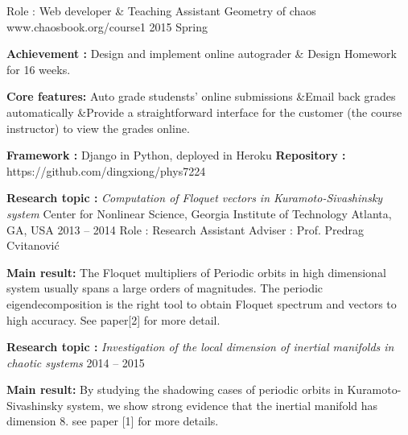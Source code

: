


\begin{cventries}


\cventry
{Role : Web developer \& Teaching Assistant}
{Geometry of chaos}
{www.chaosbook.org/course1}
{2015 Spring}
{
  \begin{cvitems}
    \item {\textbf{Achievement : } Design and implement online autograder \& Design Homework for 16 weeks.}
    \item {\textbf{Core features:} Auto grade studensts' online submissions
        \quad\&\quad Email back grades automatically \quad\&\quad Provide a straightforward interface for the customer (the course instructor)
      to view the grades online.}
    \item {\textbf{Framework :} Django in Python, deployed in Heroku \quad
      \textbf{Repository :} {\color{black} https://github.com/dingxiong/phys7224} 
    }
  \end{cvitems}
}

\cventrymore
{\textbf{Research topic :} \emph{Computation of Floquet vectors in Kuramoto-Sivashinsky system}}
{Center for Nonlinear Science, Georgia Institute of Technology}
{Atlanta, GA, USA}
{2013 -- 2014}
{Role : Research Assistant \quad Adviser : Prof. Predrag Cvitanovi\'c }
{
  \begin{cvitems}
  \item {\textbf{Main result:} The Floquet multipliers of Periodic orbits in high dimensional system 
      usually spans a large orders of magnitudes. The periodic eigendecomposition is the right tool
      to obtain Floquet spectrum and vectors to high accuracy. See paper[2] for more detail.
    }
  \end{cvitems}
}

\cventry
{\textbf{Research topic :} \emph{Investigation of the local dimension of inertial manifolds in chaotic systems}}
{}{}
{2014 -- 2015}
{
  \begin{cvitems}
    \item {\textbf{Main result:} By studying the shadowing cases of periodic orbits in
        Kuramoto-Sivashinsky system, we show strong evidence that the inertial manifold has
        dimension 8. see paper [1] for more details.}
  \end{cvitems}
}


\end{cventries}
